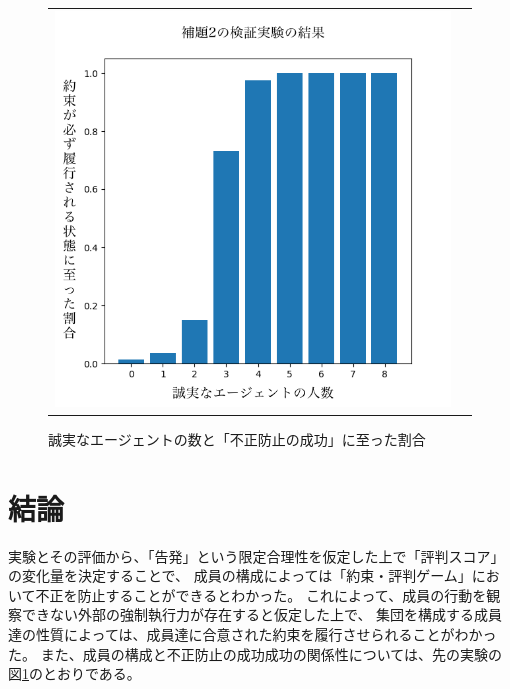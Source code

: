 \begin{figure}[h]
  \begin{tabular}{cc}
    \begin{minipage}[t]{1\hsize}
      \centering
      \includegraphics[keepaspectratio, width=1\linewidth]{./06_ethical-prgame/figure01.png}
      \caption{誠実なエージェントの数と「不正防止の成功」に至った割合}
      \label{ethical-game-001}
    \end{minipage}
  \end{tabular}
\end{figure}

\section{結論}
実験とその評価から、「告発」という限定合理性を仮定した上で「評判スコア」の変化量を決定することで、
成員の構成によっては「約束・評判ゲーム」において不正を防止することができるとわかった。
これによって、成員の行動を観察できない外部の強制執行力が存在すると仮定した上で、
集団を構成する成員達の性質によっては、成員達に合意された約束を履行させられることがわかった。
また、成員の構成と不正防止の成功成功の関係性については、先の実験の図\ref{ethical-game-001}のとおりである。
